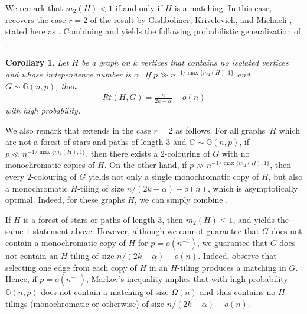 \documentclass[a4paper,reqno,11pt]{amsart}
\newtheorem{corollary}[theorem]{Corollary}
\theoremstyle{definition}
\theoremstyle{remark}
\renewcommand\le{\leqslant}
\begin{document}
We remark that $m_2(H) <1$ if and only if $H$ is a matching. In this case,  recovers the case $r=2$ of the result by Gishboliner, Krivelevich, and Michaeli \cite{GKM}, stated here as . Combining  and  yields the following probabilistic generalization of .

\begin{corollary}\label{cor:Hlower1}
    Let $H$ be a graph on $k$ vertices that contains no isolated vertices and whose independence number is $\alpha$. If $p\gg n^{-1/\max\{m_2(H),1\}}$ and $G\sim \mathbb{G}(n,p)$, then
\begin{align*}
 Rt(H,G) = \frac{n}{2k-\alpha}-o(n)
\end{align*}
with high probability. 
\end{corollary}

We also remark that  extends  in the case $r=2$ as follows. For all graphs~$H$ which are not a forest of stars and paths of length $3$ and $G \sim \mathbb{G}(n,p)$, if  $p \ll n^{-1/\max\{m_2(H),1\}}$, then there exists a $2$-colouring of $G$ with no monochromatic copies of $H$. On the other hand, if $p \gg n^{-1/\max\{m_2(H),1\}}$, then every $2$-colouring of $G$ yields not only a single monochromatic copy of $H$, but also a monochromatic $H$-tiling of size $n/(2k-\alpha)-o(n)$, which is asymptotically optimal. Indeed, for these graphs $H$, we can simply combine .

If $H$ is a forest of stars or paths of length $3$, then $m_2(H) \le 1$, and  yields the same $1$-statement above. However, although we cannot guarantee that $G$ does not contain a monochromatic copy of $H$ for $p=o(n^{-1})$, we guarantee that $G$ does not contain an $H$-tiling of size $n/(2k-\alpha)-o(n)$. Indeed, observe that selecting one edge from each copy of $H$ in an $H$-tiling produces a matching in $G$. Hence, if $p = o(n^{-1})$, Markov's inequality implies that with high probability $\mathbb{G}(n,p)$ does not contain a matching of size $\Omega(n)$ and thus contains no $H$-tilings (monochromatic or otherwise) of size $n/(2k-\alpha)-o(n)$.
\end{document}
